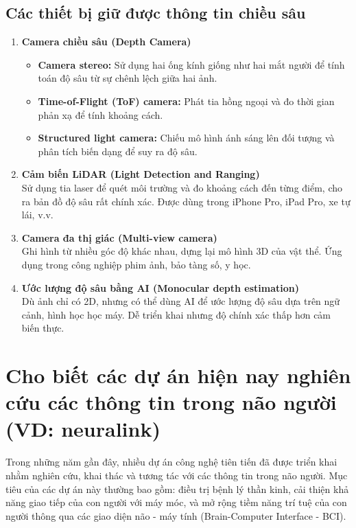 \documentclass[12pt]{article}
\begin{document}
	\subsection*{Các thiết bị giữ được thông tin chiều sâu}
	
	\begin{enumerate}
	\item \textbf{Camera chiều sâu (Depth Camera)}
	\begin{itemize}
	\item \textbf{Camera stereo:} Sử dụng hai ống kính giống như hai mắt người để tính toán độ sâu từ sự chênh lệch giữa hai ảnh.
	\item \textbf{Time-of-Flight (ToF) camera:} Phát tia hồng ngoại và đo thời gian phản xạ để tính khoảng cách.
	\item \textbf{Structured light camera:} Chiếu mô hình ánh sáng lên đối tượng và phân tích biến dạng để suy ra độ sâu.
	\end{itemize}
	
	\item \textbf{Cảm biến LiDAR (Light Detection and Ranging)} \\
	Sử dụng tia laser để quét môi trường và đo khoảng cách đến từng điểm, cho ra bản đồ độ sâu rất chính xác. Được dùng trong iPhone Pro, iPad Pro, xe tự lái, v.v.
	
	\item \textbf{Camera đa thị giác (Multi-view camera)} \\
	Ghi hình từ nhiều góc độ khác nhau, dựng lại mô hình 3D của vật thể. Ứng dụng trong công nghiệp phim ảnh, bảo tàng số, y học.
	
	\item \textbf{Ước lượng độ sâu bằng AI (Monocular depth estimation)} \\
	Dù ảnh chỉ có 2D, nhưng có thể dùng AI để ước lượng độ sâu dựa trên ngữ cảnh, hình học học máy. Dễ triển khai nhưng độ chính xác thấp hơn cảm biến thực.
	\end{enumerate}
	
	\section{Cho biết các dự án hiện nay nghiên cứu các thông tin trong não người (VD: neuralink)}
	
	Trong những năm gần đây, nhiều dự án công nghệ tiên tiến đã được triển khai nhằm nghiên cứu, khai thác và tương tác với các thông tin trong não người. Mục tiêu của các dự án này thường bao gồm: điều trị bệnh lý thần kinh, cải thiện khả năng giao tiếp của con người với máy móc, và mở rộng tiềm năng trí tuệ của con người thông qua các giao diện não - máy tính (Brain-Computer Interface - BCI).
	
\end{document}
